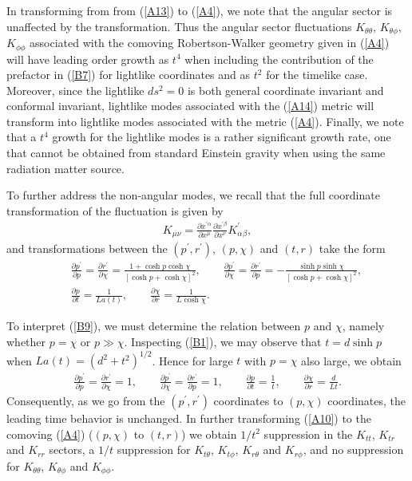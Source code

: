 In transforming from from (\ref{A13}) to (\ref{A4}), we note that the angular sector is unaffected by the transformation. Thus the angular sector fluctuations $K_{\theta\theta}$, $K_{\theta  \phi}$, $K_{\phi\phi}$ associated with the comoving Robertson-Walker geometry given in (\ref{A4}) will have leading order growth as $t^4$ when including the contribution of the prefactor in (\ref{B7}) for lightlike coordinates and as $t^2$ for the timelike case. Moreover, since the lightlike $ds^2=0$ is both general coordinate invariant and conformal invariant, lightlike modes associated with the (\ref{A14}) metric will transform into lightlike modes associated with the metric (\ref{A4}). Finally, we note that a $t^4$ growth for the lightlike modes is a rather significant growth rate, one that cannot be obtained from standard Einstein gravity when using the same radiation matter source.

To further address the non-angular modes, we recall that the full coordinate transformation of the fluctuation is given by
%
\begin{eqnarray}
K_{\mu\nu}=\frac{\partial x^{\prime \alpha}}{\partial x^{\mu}}\frac{\partial x^{\prime\beta}}{\partial x^{\nu}}K^{\prime}_{\alpha\beta},
\label{B8}
\end{eqnarray}
%
and transformations between the $(p^{\prime}, r^{\prime})$, $(p,\chi)$ and $(t,r)$ take the form
%
\begin{eqnarray}
&&\frac{\partial p^{\prime }}{\partial p}=\frac{\partial r^{\prime }}{\partial \chi}=\frac{1+\cosh p\cosh\chi}{[\cosh p+\cosh\chi]^2},\qquad
\frac{\partial p^{\prime }}{\partial \chi}=\frac{\partial r^{\prime }}{\partial p}=-\frac{\sinh p\sinh\chi}{[\cosh p+\cosh\chi]^2}, 
\nonumber\\
&& \frac{\partial p}{\partial t}=\frac{1}{La(t)},\qquad \frac{\partial \chi}{\partial r}=\frac{1}{L\cosh\chi}.
\label{B9}
\end{eqnarray}
%

To interpret (\ref{B9}), we must determine the relation between $p$ and $\chi$, namely whether $p=\chi$ or $p\gg \chi$. Inspecting (\ref{B1}), we may observe that $t=d\sinh p$ when $La(t)=(d^2+t^2)^{1/2}$. Hence for large $t$ with $p=\chi$ also large, we obtain
%
\begin{eqnarray}
\frac{\partial p^{\prime }}{\partial p}=\frac{\partial r^{\prime }}{\partial \chi}=1,\qquad
\frac{\partial p^{\prime }}{\partial \chi}=\frac{\partial r^{\prime }}{\partial p}=1,\qquad \frac{\partial p}{\partial t}=\frac{1}{t},\qquad \frac{\partial \chi}{\partial r}=\frac{d}{Lt}.
\label{B10}
\end{eqnarray}
%
Consequently, as we go from the  $(p^{\prime},r^{\prime})$ coordinates to $(p,\chi)$ coordinates, the leading time behavior is unchanged. In further transforming (\ref{A10}) to the comoving (\ref{A4}) ($(p,\chi)$ to $(t,r)$) we obtain $1/t^2$ suppression in the $K_{tt}$, $K_{tr}$ and $K_{rr}$ sectors, a $1/t$ suppression for $K_{t\theta}$, $K_{t\phi}$, $K_{r\theta}$ and $K_{r\phi}$, and no suppression for $K_{\theta\theta}$, $K_{\theta\phi}$ and $K_{\phi\phi}$.

